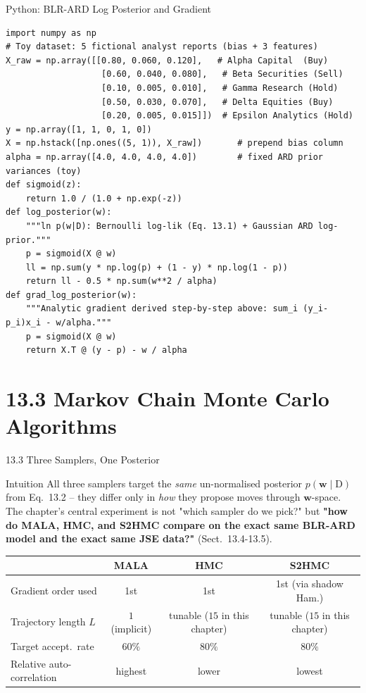 \documentclass[aspectratio=169,10pt]{beamer}
\newcommand{\w}{\mathbf{w}}
\newcommand{\Data}{\mathrm{D}}
\begin{document}
\begin{frame}[fragile]{Python: BLR-ARD Log Posterior and Gradient}
\begin{lstlisting}[caption={From-scratch log posterior and analytic gradient (Eqs. 13.1-13.2, and the derivation above)}]
import numpy as np
# Toy dataset: 5 fictional analyst reports (bias + 3 features)
X_raw = np.array([[0.80, 0.060, 0.120],   # Alpha Capital  (Buy)
                   [0.60, 0.040, 0.080],   # Beta Securities (Sell)
                   [0.10, 0.005, 0.010],   # Gamma Research (Hold)
                   [0.50, 0.030, 0.070],   # Delta Equities (Buy)
                   [0.20, 0.005, 0.015]])  # Epsilon Analytics (Hold)
y = np.array([1, 1, 0, 1, 0])
X = np.hstack([np.ones((5, 1)), X_raw])       # prepend bias column
alpha = np.array([4.0, 4.0, 4.0, 4.0])        # fixed ARD prior variances (toy)
def sigmoid(z):
    return 1.0 / (1.0 + np.exp(-z))
def log_posterior(w):
    """ln p(w|D): Bernoulli log-lik (Eq. 13.1) + Gaussian ARD log-prior."""
    p = sigmoid(X @ w)
    ll = np.sum(y * np.log(p) + (1 - y) * np.log(1 - p))
    return ll - 0.5 * np.sum(w**2 / alpha)
def grad_log_posterior(w):
    """Analytic gradient derived step-by-step above: sum_i (y_i-p_i)x_i - w/alpha."""
    p = sigmoid(X @ w)
    return X.T @ (y - p) - w / alpha
\end{lstlisting}
\end{frame}

\section{13.3 Markov Chain Monte Carlo Algorithms}

\begin{frame}{13.3 \; Three Samplers, One Posterior}
  \begin{block}{Intuition}
    All three samplers target the \emph{same} un-normalised posterior
    $p(\w\mid\Data)$ from Eq.~13.2 -- they differ only in \emph{how} they
    propose moves through $\w$-space. The chapter's central experiment is not
    "which sampler do we pick?" but \textbf{"how do MALA, HMC, and S2HMC
    compare on the exact same BLR-ARD model and the exact same JSE data?"}
    (Sect.~13.4-13.5).
  \end{block}
  \begin{center}
    \begin{tabular}{lccc}
      \toprule
       & MALA & HMC & S2HMC\\
      \midrule
      Gradient order used     & 1st & 1st & 1st (via shadow Ham.)\\
      Trajectory length $L$   & $1$ (implicit)  & tunable ($15$ in this chapter) & tunable ($15$ in this chapter)\\
      Target accept.\ rate    & $60\%$ & $80\%$ & $80\%$\\
      Relative auto-correlation & highest & lower & lowest\\
      \bottomrule
    \end{tabular}
  \end{center}
\end{frame}
\end{document}
